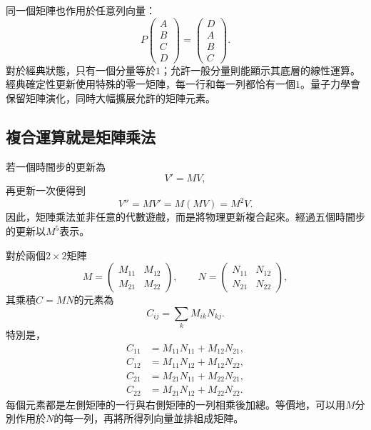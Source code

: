 同一個矩陣也作用於任意列向量：
\begin{equation}
  P
  \begin{pmatrix}A\\B\\C\\D\end{pmatrix}
  =
  \begin{pmatrix}D\\A\\B\\C\end{pmatrix}.
  \label{eq:l01-cyclic-shift}
\end{equation}
對於經典狀態，只有一個分量等於\(1\)；允許一般分量則能顯示其底層的線性運算。經典確定性更新使用特殊的零一矩陣，每一行和每一列都恰有一個\(1\)。量子力學會保留矩陣演化，同時大幅擴展允許的矩陣元素。

\subsection{複合運算就是矩陣乘法}

若一個時間步的更新為
\begin{equation}
  V'=MV,
\end{equation}
再更新一次便得到
\begin{equation}
  V''=MV'=M(MV)=M^2V.
  \label{eq:l01-two-updates}
\end{equation}
因此，矩陣乘法並非任意的代數遊戲，而是將物理更新複合起來。經過五個時間步的更新以\(M^5\)表示。

對於兩個\(2\times2\)矩陣
\begin{equation}
  M=
  \begin{pmatrix}
    M_{11}&M_{12}\\
    M_{21}&M_{22}
  \end{pmatrix},
  \qquad
  N=
  \begin{pmatrix}
    N_{11}&N_{12}\\
    N_{21}&N_{22}
  \end{pmatrix},
\end{equation}
其乘積\(C=MN\)的元素為
\begin{equation}
  C_{ij}=\sum_k M_{ik}N_{kj}.
  \label{eq:l01-matrix-product}
\end{equation}
特別是，
\begin{align}
  C_{11}&=M_{11}N_{11}+M_{12}N_{21},\\
  C_{12}&=M_{11}N_{12}+M_{12}N_{22},\\
  C_{21}&=M_{21}N_{11}+M_{22}N_{21},\\
  C_{22}&=M_{21}N_{12}+M_{22}N_{22}.
\end{align}
每個元素都是左側矩陣的一行與右側矩陣的一列相乘後加總。等價地，可以用\(M\)分別作用於\(N\)的每一列，再將所得列向量並排組成矩陣。

